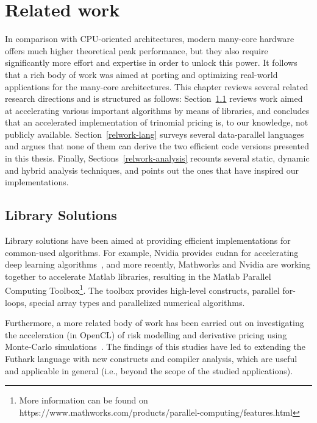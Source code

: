 \chapter{Related work}
\label{chapter:relatedwork}

In comparison with CPU-oriented architectures, modern many-core hardware offers much higher theoretical peak performance, but they also require significantly more effort and expertise in order to unlock this power.   It follows that a rich body of work was aimed at porting and optimizing real-world applications for the many-core architectures. This chapter reviews several related research directions and is structured as follows: Section~\ref{relwork-lib} reviews work aimed at accelerating various important algorithms by means of libraries, and concludes that an accelerated implementation of trinomial pricing is, to our knowledge, not publicly available. Section~\ref{relwork-lang} surveys several data-parallel languages and argues that none of them can derive the two efficient code versions presented in this thesis. Finally, Sections~\ref{relwork-analysis} recounts several static, dynamic and hybrid analysis techniques, and points out the ones that have inspired our implementations.

\section{Library Solutions}
\label{relwork-lib}

Library solutions have been aimed at providing efficient implementations for common-used algorithms. For example, Nvidia provides {\sc cudnn} for accelerating deep learning algorithms~\cite{cudnn}, and more recently, Mathworks and Nvidia are working together to accelerate Matlab libraries, resulting in the Matlab Parallel Computing Toolbox\footnote{More information can be found on https://www.mathworks.com/products/parallel-computing/features.html}. The toolbox provides high-level constructs, parallel for-loops, special array types and parallelized numerical algorithms.   

Furthermore, a more related body of work has been carried out on investigating the acceleration (in OpenCL) of risk modelling and derivative pricing using Monte-Carlo simulations~\cite{FinPar:TACO,LexiFiPricing}. The findings of this studies have led to extending the Futhark language with new constructs and compiler analysis, which are useful and applicable in general (i.e., beyond the scope of the studied applications).

